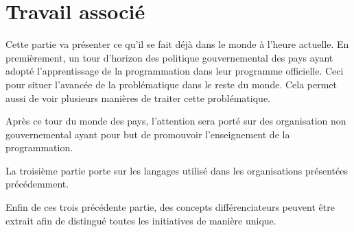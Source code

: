 \chapter{Travail associé}
Cette partie va présenter ce qu'il se fait déjà dans le monde à l'heure actuelle. En premièrement, un tour d'horizon des politique gouvernemental des pays ayant adopté l'apprentissage de la programmation dans leur programme officielle. Ceci pour situer l'avancée de la problématique dans le reste du monde. Cela permet aussi de voir plusieurs manières de traiter cette problématique. 

Après ce tour du monde des pays, l'attention sera porté sur des organisation non gouvernemental ayant pour but de promouvoir l'enseignement de la programmation. 

La troisième partie porte sur les langages utilisé dans les organisations présentées précédemment. 

Enfin de ces trois précédente partie, des concepts différenciateurs peuvent être extrait afin de distingué toutes les initiatives de manière unique.






